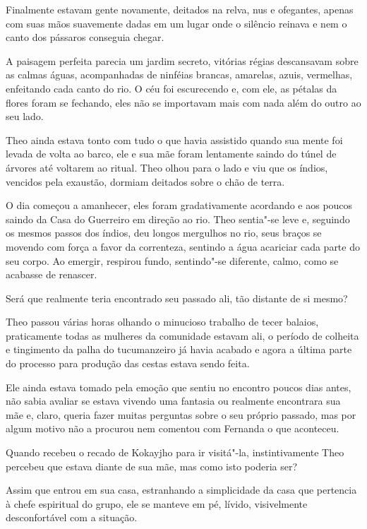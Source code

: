 Finalmente estavam gente novamente, deitados na relva, nus e ofegantes,
apenas com suas mãos suavemente dadas em um lugar onde o silêncio
reinava e nem o canto dos pássaros conseguia chegar.

A paisagem perfeita parecia um jardim secreto, vitórias régias
descansavam sobre as calmas águas, acompanhadas de ninféias brancas,
amarelas, azuis, vermelhas, enfeitando cada canto do rio. O céu foi
escurecendo e, com ele, as pétalas da flores foram se fechando, eles não
se importavam mais com nada além do outro ao seu lado.

Theo ainda estava tonto com tudo o que havia assistido quando sua mente
foi levada de volta ao barco, ele e sua mãe foram lentamente saindo do
túnel de árvores até voltarem ao ritual. Theo olhou para o lado e viu
que os índios, vencidos pela exaustão, dormiam deitados sobre o chão de
terra.

O dia começou a amanhecer, eles foram gradativamente acordando e aos
poucos saindo da Casa do Guerreiro em direção ao rio. Theo sentia"-se
leve e, seguindo os mesmos passos dos índios, deu longos mergulhos no
rio, seus braços se movendo com força a favor da correnteza, sentindo a
água acariciar cada parte do seu corpo. Ao emergir, respirou fundo,
sentindo"-se diferente, calmo, como se acabasse de renascer.

Será que realmente teria encontrado seu passado ali, tão distante de si
mesmo?

\asterisc


Theo passou várias horas olhando o minucioso trabalho de tecer balaios,
praticamente todas as mulheres da comunidade estavam ali, o período de
colheita e tingimento da palha do tucumanzeiro já havia acabado e agora
a última parte do processo para produção das cestas estava sendo feita.

Ele ainda estava tomado pela emoção que sentiu no encontro poucos dias
antes, não sabia avaliar se estava vivendo uma fantasia ou realmente
encontrara sua mãe e, claro, queria fazer muitas perguntas sobre o seu
próprio passado, mas por algum motivo não a procurou nem comentou com
Fernanda o que aconteceu.

Quando recebeu o recado de Kokayjho para ir visitá"-la, instintivamente
Theo percebeu que estava diante de sua mãe, mas como isto poderia ser?

Assim que entrou em sua casa, estranhando a simplicidade da casa que
pertencia à chefe espiritual do grupo, ele se manteve em pé, lívido,
visivelmente desconfortável com a situação.

